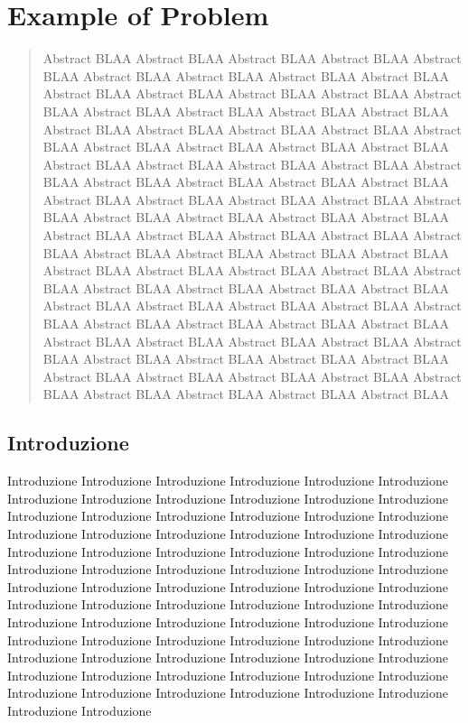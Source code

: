 \documentclass{ipspproceeding}
\begin{document}
\editorialNotes

\chapter{Example of Problem}


\begin{abstract}
Abstract BLAA Abstract BLAA Abstract BLAA Abstract BLAA Abstract BLAA Abstract BLAA Abstract BLAA Abstract BLAA Abstract BLAA Abstract BLAA Abstract BLAA Abstract BLAA Abstract BLAA Abstract BLAA Abstract BLAA Abstract BLAA Abstract BLAA Abstract BLAA
Abstract BLAA Abstract BLAA Abstract BLAA Abstract BLAA Abstract BLAA Abstract BLAA Abstract BLAA Abstract BLAA Abstract BLAA Abstract BLAA Abstract BLAA Abstract BLAA Abstract BLAA Abstract BLAA Abstract BLAA Abstract BLAA Abstract BLAA Abstract BLAA
Abstract BLAA Abstract BLAA Abstract BLAA Abstract BLAA Abstract BLAA Abstract BLAA Abstract BLAA Abstract BLAA Abstract BLAA Abstract BLAA Abstract BLAA Abstract BLAA Abstract BLAA Abstract BLAA Abstract BLAA Abstract BLAA Abstract BLAA Abstract BLAA
Abstract BLAA Abstract BLAA Abstract BLAA Abstract BLAA Abstract BLAA Abstract BLAA Abstract BLAA Abstract BLAA Abstract BLAA Abstract BLAA Abstract BLAA Abstract BLAA Abstract BLAA Abstract BLAA Abstract BLAA Abstract BLAA Abstract BLAA Abstract BLAA
Abstract BLAA Abstract BLAA Abstract BLAA Abstract BLAA Abstract BLAA Abstract BLAA Abstract BLAA Abstract BLAA Abstract BLAA Abstract BLAA Abstract BLAA Abstract BLAA Abstract BLAA Abstract BLAA Abstract BLAA Abstract BLAA Abstract BLAA Abstract BLAA

\end{abstract}
\section{Introduzione}
Introduzione Introduzione Introduzione Introduzione Introduzione Introduzione Introduzione Introduzione Introduzione Introduzione
Introduzione Introduzione Introduzione Introduzione Introduzione Introduzione Introduzione Introduzione Introduzione Introduzione
Introduzione Introduzione Introduzione Introduzione Introduzione Introduzione Introduzione Introduzione Introduzione Introduzione
Introduzione Introduzione Introduzione Introduzione Introduzione Introduzione Introduzione Introduzione Introduzione Introduzione
Introduzione Introduzione Introduzione Introduzione Introduzione Introduzione Introduzione Introduzione Introduzione Introduzione
Introduzione Introduzione Introduzione Introduzione Introduzione Introduzione Introduzione Introduzione Introduzione Introduzione
Introduzione Introduzione Introduzione Introduzione Introduzione Introduzione Introduzione Introduzione Introduzione Introduzione
Introduzione Introduzione Introduzione Introduzione Introduzione Introduzione Introduzione Introduzione Introduzione Introduzione
\end{document}
